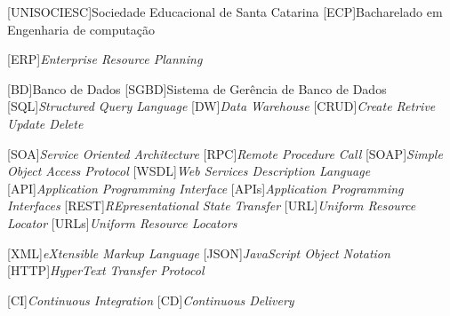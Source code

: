
[UNISOCIESC]{Sociedade Educacional de Santa Catarina}
[ECP]{Bacharelado em Engenharia de computação}

[ERP]{\emph{Enterprise Resource Planning}}

[BD]{Banco de Dados}
[SGBD]{Sistema de Gerência de Banco de Dados}
[SQL]{\emph{Structured Query Language}}
[DW]{\emph{Data Warehouse}}
[CRUD]{\emph{Create Retrive Update Delete}}

[SOA]{\emph{Service Oriented Architecture}}
[RPC]{\emph{Remote Procedure Call}}
[SOAP]{\emph{Simple Object Access Protocol}}
[WSDL]{\emph{Web Services Description Language}}
[API]{\emph{Application Programming Interface}}
[APIs]{\emph{Application Programming Interfaces}}
[REST]{\emph{REpresentational State Transfer}}
[URL]{\emph{Uniform Resource Locator}}
[URLs]{\emph{Uniform Resource Locators}}

[XML]{\emph{eXtensible Markup Language}}
[JSON]{\emph{JavaScript Object Notation}}
[HTTP]{\emph{HyperText Transfer Protocol}}

[CI]{\emph{Continuous Integration}}
[CD]{\emph{Continuous Delivery}}
